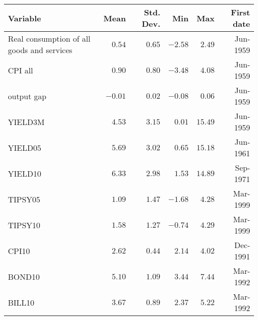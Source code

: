 \begin{tabular}{lrrrrr} \hline Variable & Mean & Std. Dev. & Min & Max & First date \\ \hline Real consumption of all goods and services & $0.54$ & $0.65$ & $-2.58$ & $2.49$ & Jun-1959 \\ CPI all  & $0.90$ & $0.80$ & $-3.48$ & $4.08$ & Jun-1959 \\ output gap & $-0.01$ & $0.02$ & $-0.08$ & $0.06$ & Jun-1959 \\ YIELD3M & $4.53$ & $3.15$ & $0.01$ & $15.49$ & Jun-1959 \\ YIELD05 & $5.69$ & $3.02$ & $0.65$ & $15.18$ & Jun-1961 \\ YIELD10 & $6.33$ & $2.98$ & $1.53$ & $14.89$ & Sep-1971 \\ TIPSY05 & $1.09$ & $1.47$ & $-1.68$ & $4.28$ & Mar-1999 \\ TIPSY10 & $1.58$ & $1.27$ & $-0.74$ & $4.29$ & Mar-1999 \\ CPI10 & $2.62$ & $0.44$ & $2.14$ & $4.02$ & Dec-1991 \\ BOND10 & $5.10$ & $1.09$ & $3.44$ & $7.44$ & Mar-1992 \\ BILL10 & $3.67$ & $0.89$ & $2.37$ & $5.22$ & Mar-1992 \\ \hline \end{tabular}